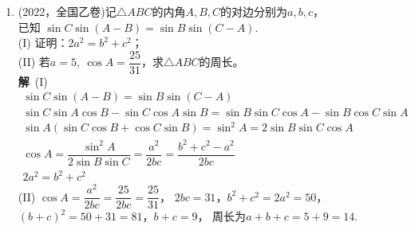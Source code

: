 \begin{enumerate}[label={【\textbf{例\thechapter.\arabic*}】},
 leftmargin=\inteval{\myenumleftmargin}pt,
 itemsep=\inteval{\myenumitempsep}pt,
 itemindent=\inteval{\myenumitemindent}pt]
\item (2022，全国乙卷)记$\triangle ABC$的内角$A, B, C$的对边分别为$a, b, c$，\\
已知 $\sin C\sin(A-B)=\sin B\sin(C-A)$. \\
(I) 证明：$2a^{2}=b^{2}+c^{2}$；\\
(II) 若$a=5,\ \cos A=\dfrac{25}{31}$，求$\triangle ABC$的周长。\\
\textbf{解}\ (I)
\begin{gather*}
    \sin C\sin(A-B)=\sin B\sin(C-A) \\
    \sin C\sin A\cos B-\sin C\cos A\sin B=
    \sin B\sin C\cos A-\sin B\cos C\sin A \\
    \sin A(\sin C\cos B+\cos C\sin B)=\sin^2A=2\sin B\sin C\cos A \\
    \cos A=\dfrac{\sin^2 A}{2\sin B\sin C}=\dfrac{a^2}{2bc}=
    \dfrac{b^2+c^2-a^2}{2bc} \\
    2a^{2}=b^{2}+c^{2}
\end{gather*}
(II) $ \cos A=\dfrac{a^2}{2bc}=\dfrac{25}{2bc}=\dfrac{25}{31} $，
$ 2bc=31 $，$ b^{2}+c^{2}=2a^2=50 $，$ (b+c)^2=50+31=81 $，$ b+c=9 $，
周长为$ a+b+c=5+9=14 $.


\end{enumerate}
